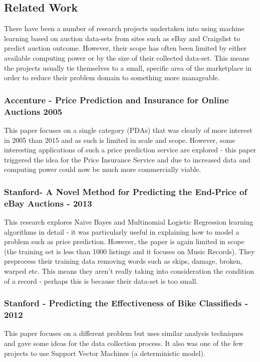 \documentclass[12pt]{article}
\begin{document}
\subsection{Related Work}
There have been a number of research projects undertaken into using machine learning based on auction data-sets from sites such as eBay and Craigslist to predict auction outcome. However, their scope has often been limited by either available computing power or by the size of their collected data-set. This means the projects usually tie themselves to a small, specific area of the marketplace in order to reduce their problem domain to something more manageable.

\subsubsection{Accenture - Price Prediction and Insurance for Online Auctions 2005}
This paper focuses on a single category (PDAs) that was clearly of more interest in 2005 than 2015 and as such is limited in scale and scope. However, some interesting applications of such a price prediction service are explored - this paper triggered the idea for the Price Insurance Service and due to increased data and computing power could now be much more commercially viable.

\subsubsection{Stanford- A Novel Method for Predicting the End-Price of eBay Auctions - 2013}
 This research explores Naive Bayes and Multinomial Logistic Regression learning algorithms in detail - it was particularly useful in explaining how to model a problem such as price prediction. However, the paper is again limited in scope (the training set is less than 1000 listings and it focuses on Music Records). They preprocess their training data removing words such as skips, damage, broken, warped etc. This means they aren't really taking into consideration the condition of a record - perhaps this is because their data-set is too small.
 
\subsubsection{Stanford - Predicting the Effectiveness of Bike Classifieds - 2012}
This paper focuses on a different problem but uses similar analysis techniques and gave some ideas for the data collection process. It also was one of the few projects to use Support Vector Machines (a deterministic model).
\end{document}
